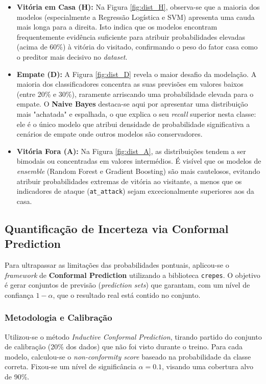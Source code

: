 \documentclass[10pt]{article}
\begin{document}
\begin{itemize}
    \item \textbf{Vitória em Casa (H):} Na Figura \ref{fig:dist_H}, observa-se que a maioria dos modelos (especialmente a Regressão Logística e SVM) apresenta uma cauda mais longa para a direita. Isto indica que os modelos encontram frequentemente evidência suficiente para atribuir probabilidades elevadas (acima de 60\%) à vitória do visitado, confirmando o peso do fator casa como o preditor mais decisivo no \textit{dataset}.
    
    \item \textbf{Empate (D):} A Figura \ref{fig:dist_D} revela o maior desafio da modelação. A maioria dos classificadores concentra as suas previsões em valores baixos (entre 20\% e 30\%), raramente arriscando uma probabilidade elevada para o empate. O \textbf{Naive Bayes} destaca-se aqui por apresentar uma distribuição mais "achatada" e espalhada, o que explica o seu \textit{recall} superior nesta classe: ele é o único modelo que atribui densidade de probabilidade significativa a cenários de empate onde outros modelos são conservadores.

    \item \textbf{Vitória Fora (A):} Na Figura \ref{fig:dist_A}, as distribuições tendem a ser bimodais ou concentradas em valores intermédios. É visível que os modelos de \textit{ensemble} (Random Forest e Gradient Boosting) são mais cautelosos, evitando atribuir probabilidades extremas de vitória ao visitante, a menos que os indicadores de ataque (\texttt{at\_attack}) sejam excecionalmente superiores aos da casa.
\end{itemize}


\subsection{Quantificação de Incerteza via Conformal Prediction}

Para ultrapassar as limitações das probabilidades pontuais, aplicou-se o \textit{framework} de \textbf{Conformal Prediction} utilizando a biblioteca \texttt{crepes}. O objetivo é gerar conjuntos de previsão (\textit{prediction sets}) que garantam, com um nível de confiança $1-\alpha$, que o resultado real está contido no conjunto.

\subsubsection{Metodologia e Calibração}
Utilizou-se o método \textit{Inductive Conformal Prediction}, tirando partido do conjunto de calibração (20\% dos dados) que não foi visto durante o treino. Para cada modelo, calculou-se o \textit{non-conformity score} baseado na probabilidade da classe correta. Fixou-se um nível de significância $\alpha = 0.1$, visando uma cobertura alvo de 90\%.
\end{document}
